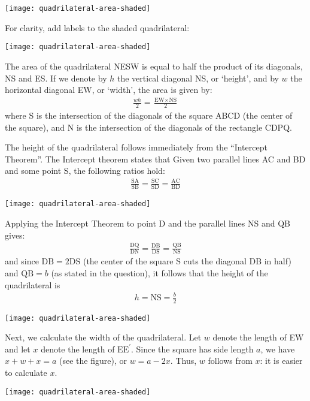 \documentclass[12pt]{article}
\begin{document}
\begin{center}
\texttt{[image: quadrilateral-area-shaded]}
\end{center}

\begin{answer}
For clarity, add labels to the shaded quadrilateral: 
\begin{center}
\texttt{[image: quadrilateral-area-shaded]}
\end{center}
The area of the quadrilateral NESW is equal to half the product of its diagonals, NS and ES. If we denote by $h$ the vertical diagonal NS, or `height', and by $w$ the horizontal diagonal EW, or `width', the area is given by:
\begin{align*}
\frac{wh}{2}
 = 
\frac{\text{EW} \times \text{NS}}{2}
\end{align*}
where S is the intersection of the diagonals of the square ABCD (the center of the square), and N is the intersection of the diagonals of the rectangle CDPQ.

The height of the quadrilateral follows immediately from the ``Intercept Theorem''. The Intercept theorem states that Given two parallel lines AC and BD and some point S, the following ratios hold:
\begin{align*}
\frac{\text{SA}}{\text{SB}} 
  = \frac{\text{SC}}{\text{SD}} 
  = \frac{\text{AC}}{\text{BD}} 
\end{align*} 
\begin{center}
\texttt{[image: quadrilateral-area-shaded]}
\end{center}

Applying the Intercept Theorem to point D and the parallel lines NS and QB gives:
\begin{align*}
\frac{\text{DQ}}{\text{DN}} 
  = \frac{\text{DB}}{\text{DS}} 
  = \frac{\text{QB}}{\text{NS}} 
\end{align*}
and since $\text{DB}=2\text{DS}$ (the center of the square S cuts the diagonal DB in half) and $\text{QB}=b$ (as stated in the question), it follows that the height of the quadrilateral is
\begin{align*}
h = \text{NS} = \frac{b}{2}
\end{align*}
\begin{center}
\texttt{[image: quadrilateral-area-shaded]}
\end{center}
Next, we calculate the width of the quadrilateral. Let $w$ denote the length of EW and let $x$ denote the length of $\text{E}\text{E}^{\prime}$. Since the square has side length $a$, we have $x+w+x=a$ (see the figure), or $w=a-2x$. Thus, $w$ follows from $x$: it is easier to calculate $x$. 
\begin{center}
\texttt{[image: quadrilateral-area-shaded]}
\end{center} 


\end{answer}
\end{document}
